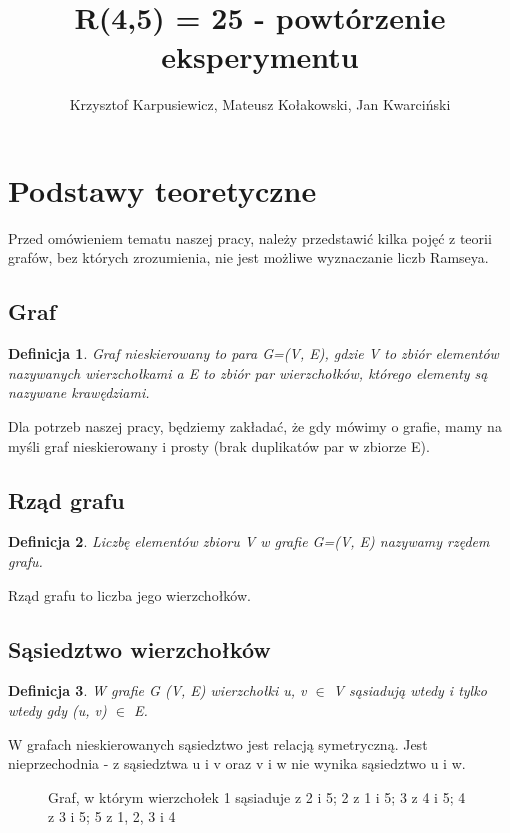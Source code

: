 \documentclass[11pt]{article}
\title{R(4,5) = 25 - powtórzenie eksperymentu}
\author{Krzysztof Karpusiewicz, Mateusz Kołakowski, Jan Kwarciński}
\newtheorem{definition}{Definicja}[section]
\begin{document}
\tableofcontents
\pagebreak

\section{Podstawy teoretyczne}

  Przed omówieniem tematu naszej pracy, należy przedstawić kilka pojęć z teorii grafów, bez których zrozumienia, nie jest możliwe wyznaczanie liczb Ramseya.

  \subsection{Graf}
  \begin{definition}
    Graf nieskierowany to para G=(V, E), gdzie V to zbiór elementów nazywanych wierzchołkami a E to zbiór par wierzchołków, którego elementy są nazywane krawędziami.
  \end{definition}

  Dla potrzeb naszej pracy, będziemy zakładać, że gdy mówimy o grafie, mamy na myśli graf nieskierowany i prosty (brak duplikatów par w zbiorze E).
  
  \subsection{Rząd grafu}
  \begin{definition}
    Liczbę elementów zbioru V w grafie G=(V, E) nazywamy rzędem grafu. 
  \end{definition}

  Rząd grafu to liczba jego wierzchołków. 

  \subsection{Sąsiedztwo wierzchołków}
  \begin{definition}
    W grafie G (V, E) wierzchołki u, v $\in$ V sąsiadują wtedy i tylko wtedy gdy (u, v) $\in$ E.    
  \end{definition}
  W grafach nieskierowanych sąsiedztwo jest relacją symetryczną. Jest nieprzechodnia - z sąsiedztwa u i v oraz v i w nie wynika sąsiedztwo u i w. \linebreak

  \begin{figure}[h]
    \centering
    \caption{Graf, w którym wierzchołek 1 sąsiaduje z 2 i 5; 2 z 1 i 5; 3 z 4 i 5; 4 z 3 i 5; 5 z 1, 2, 3 i 4 }
  \end{figure}
\end{document}
